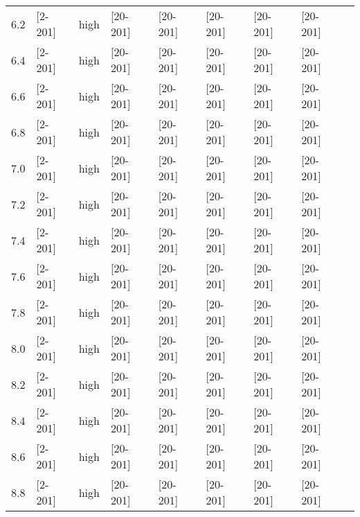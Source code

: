 \documentclass{article}
\begin{document}
\begin{tabular}{| l | l | l | l | l | l | l | l | l |}
      6.2 & [2-201] & high & [20-201] & [20-201] & [20-201] & [20-201] & [20-201] &\\
      6.4 & [2-201] & high & [20-201] & [20-201] & [20-201] & [20-201] & [20-201] &\\
      6.6 & [2-201] & high & [20-201] & [20-201] & [20-201] & [20-201] & [20-201] &\\
      6.8 & [2-201] & high & [20-201] & [20-201] & [20-201] & [20-201] & [20-201] &\\
      7.0 & [2-201] & high & [20-201] & [20-201] & [20-201] & [20-201] & [20-201] &\\
      7.2 & [2-201] & high & [20-201] & [20-201] & [20-201] & [20-201] & [20-201] &\\
      7.4 & [2-201] & high & [20-201] & [20-201] & [20-201] & [20-201] & [20-201] &\\
      7.6 & [2-201] & high & [20-201] & [20-201] & [20-201] & [20-201] & [20-201] &\\
      7.8 & [2-201] & high & [20-201] & [20-201] & [20-201] & [20-201] & [20-201] &\\
      8.0 & [2-201] & high & [20-201] & [20-201] & [20-201] & [20-201] & [20-201] &\\
      8.2 & [2-201] & high & [20-201] & [20-201] & [20-201] & [20-201] & [20-201] &\\
      8.4 & [2-201] & high & [20-201] & [20-201] & [20-201] & [20-201] & [20-201] &\\
      8.6 & [2-201] & high & [20-201] & [20-201] & [20-201] & [20-201] & [20-201] &\\
      8.8 & [2-201] & high & [20-201] & [20-201] & [20-201] & [20-201] & [20-201] &\\
      \hline
    \end{tabular}
\end{document}
